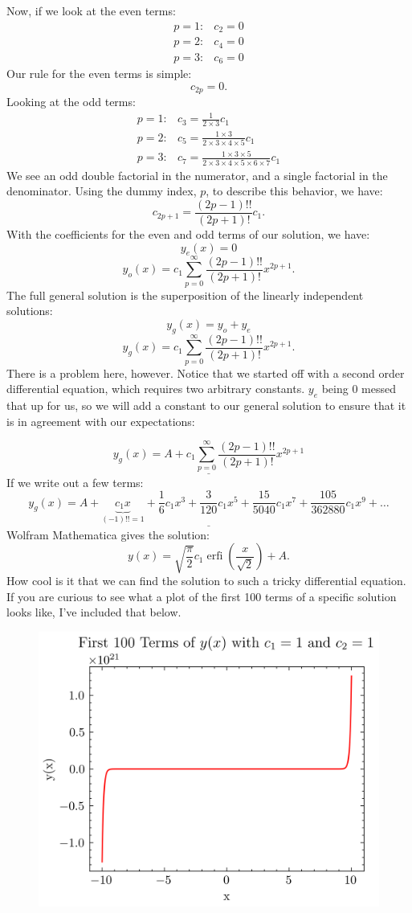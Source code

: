 \documentclass[a4paper,12pt]{article}
\begin{document}
Now, if we look at the even terms:
$$
\begin{array}{rl}
p=1: & c_2 = 0\\
p=2: & c_4=0 \\
p=3: & c_6=0 
\end{array}
$$
Our rule for the even terms is simple:
$$ c_{2p} = 0. $$
Looking at the odd terms:
$$
\begin{array}{rl}
p=1: & c_3 = \frac{1}{2\times3}c_1\\
p=2: & c_5 = \frac{1\times3}{2\times3\times4\times5}c_1 \\
p=3: & c_7 = \frac{1\times3\times5}{2\times3\times4\times5\times6\times7}c_1
\end{array}
$$
We see an odd double factorial in the numerator, and a single factorial in the denominator. Using the dummy index, $p$, to describe this behavior, we have:
$$ c_{2p+1} = \frac{(2p-1)!!}{(2p+1)!}c_1. $$
With the coefficients for the even and odd terms of our solution, we have:
$$ y_e(x) = 0 $$
$$ y_o(x) = c_1\sum_{p=0}^{\infty}\frac{(2p-1)!!}{(2p+1)!}x^{2p+1}. $$
The full general solution is the superposition of the linearly independent solutions:
$$ y_g(x) = y_o + y_e $$
$$ y_g(x) = c_1\sum_{p=0}^{\infty}\frac{(2p-1)!!}{(2p+1)!}x^{2p+1}. $$
There is a problem here, however. Notice that we started off with a second order differential equation, which requires two arbitrary constants. $y_e$ being 0 messed that up for us, so we will add a constant to our general solution to ensure that it is in agreement with our expectations:

$$ \underline{\boxed{ y_g(x) = A +  c_1\sum_{p=0}^{\infty}\frac{(2p-1)!!}{(2p+1)!}x^{2p+1}}} $$
If we write out a few terms:
$$\underline{\boxed{y_g(x) = A + \underbrace{c_1x}_{(-1)!! = 1} + \frac{1}{6}c_1x^{3} + \frac{3}{120}c_1x^5 + \frac{15}{5040}c_1x^7 + \frac{105}{362880}c_1x^9 + \ldots}} $$
Wolfram Mathematica gives the solution:
$$ y(x) = \sqrt{\frac{\pi}{2}} c_1 \operatorname{erfi}\left(\frac{x}{\sqrt{2}}\right)+A. $$
How cool is it that we can find the solution to such a tricky differential equation. If you are curious to see what a plot of the first 100 terms of a specific solution looks like, I've included that below.

\begin{figure}[ht!]
	\centering
	\includegraphics[scale=1.3]{last-one.png}
\end{figure}

\pagebreak
\end{document}
